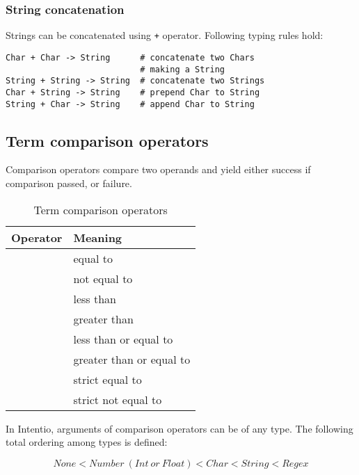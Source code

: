\subsubsection{String concatenation}

Strings can be concatenated using \lstinline{+} operator. Following typing rules hold:

\begin{lstlisting}[language=intentio]
Char + Char -> String      # concatenate two Chars
                           # making a String
String + String -> String  # concatenate two Strings
Char + String -> String    # prepend Char to String
String + Char -> String    # append Char to String
\end{lstlisting}

\subsection{Term comparison operators}

Comparison operators compare two operands and yield either success if comparison passed, or failure.

\begin{bnfutils}
\begin{table}[ht]
  \caption{Term comparison operators}
  \begin{center}
  \begin{tabular}[t]{c|l}
    \bfseries{Operator} & \bfseries{Meaning} \\
    \hline
    \term{==} & equal to \\
    \term{!=} & not equal to \\
    \term{<} & less than \\
    \term{>} & greater than \\
    \term{<=} & less than or equal to \\
    \term{>=} & greater than or equal to \\
    \term{===} & strict equal to \\
    \term{!==} & strict not equal to
  \end{tabular}
  \end{center}
\end{table}
\end{bnfutils}

In Intentio, arguments of comparison operators can be of any type. The following total ordering among types is defined:

\[
None < Number \ (Int \ or \ Float) < Char < String < Regex
\]

